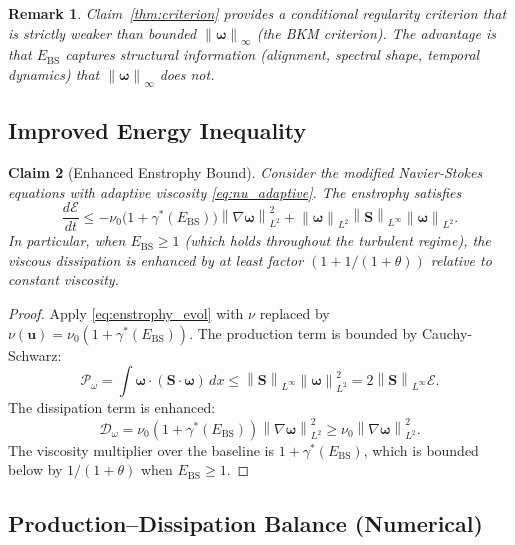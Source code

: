 \documentclass[12pt, a4paper]{article}
\newtheorem{theorem}{Claim}[section]
\newtheorem{remark}[theorem]{Remark}
\newcommand{\norm}[1]{\left\| #1 \right\|}
\newcommand{\dd}[2]{\frac{d #1}{d #2}}
\newcommand{\Ebs}{E_{\mathrm{BS}}}
\newcommand{\gammastar}{\gamma^*}
\begin{document}
\begin{remark}
Claim~\ref{thm:criterion} provides a \emph{conditional} regularity criterion that
is strictly weaker than bounded $\norm{\boldsymbol{\omega}}_\infty$
(the BKM criterion). The advantage is that $\Ebs$ captures
\emph{structural} information (alignment, spectral shape, temporal
dynamics) that $\norm{\boldsymbol{\omega}}_\infty$ does not.
\end{remark}

\subsection{Improved Energy Inequality}

\begin{theorem}[Enhanced Enstrophy Bound]\label{thm:energy}
Consider the modified Navier-Stokes equations with adaptive viscosity
\eqref{eq:nu_adaptive}. The enstrophy satisfies
\begin{equation}\label{eq:enstrophy_bound}
\dd{\mathcal{E}}{t} \leq -\nu_0\bigl(1 + \gammastar(\Ebs)\bigr)
\norm{\nabla\boldsymbol{\omega}}_{L^2}^2
+ \norm{\boldsymbol{\omega}}_{L^2} \norm{\mathbf{S}}_{L^\infty}
\norm{\boldsymbol{\omega}}_{L^2}.
\end{equation}
In particular, when $\Ebs \geq 1$ (which holds throughout the
turbulent regime), the viscous dissipation is enhanced by at least
factor $(1 + 1/(1+\theta))$ relative to constant viscosity.
\end{theorem}

\begin{proof}
Apply \eqref{eq:enstrophy_evol} with $\nu$ replaced by
$\nu(\mathbf{u}) = \nu_0(1 + \gammastar(\Ebs))$.
The production term is bounded by Cauchy-Schwarz:
\[
\mathcal{P}_\omega = \int \boldsymbol{\omega} \cdot (\mathbf{S} \cdot \boldsymbol{\omega}) \, dx
\leq \norm{\mathbf{S}}_{L^\infty} \norm{\boldsymbol{\omega}}_{L^2}^2
= 2\norm{\mathbf{S}}_{L^\infty} \mathcal{E}.
\]
The dissipation term is enhanced:
\[
\mathcal{D}_\omega = \nu_0(1 + \gammastar(\Ebs)) \norm{\nabla\boldsymbol{\omega}}_{L^2}^2
\geq \nu_0 \norm{\nabla\boldsymbol{\omega}}_{L^2}^2.
\]
The viscosity multiplier over the baseline is $1+\gammastar(\Ebs)$,
which is bounded below by $1/(1+\theta)$ when $\Ebs \geq 1$.
\end{proof}

\subsection{Production--Dissipation Balance (Numerical)}
\end{document}
